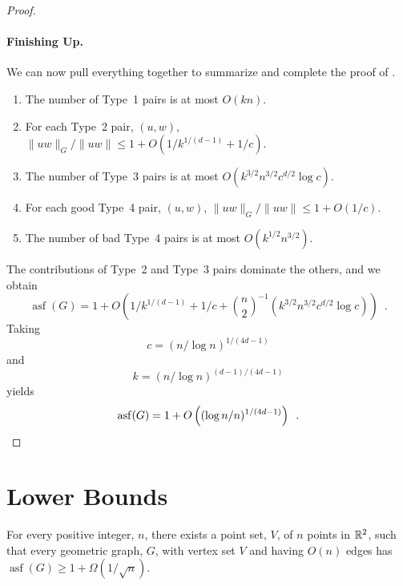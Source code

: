 \documentclass{patmorin}
\DeclareMathOperator{\asf}{asf}
\begin{document}
\begin{proof}
  \paragraph{Finishing Up.}
  We can now pull everything together to summarize and complete the proof
  of .
  \begin{enumerate}
    \item The number of Type~1 pairs is at most $O(kn)$.
    \item For each Type~2 pair, $(u,w)$, 
      $\|uw\|_G/\|uw\|\le 1+ O(1/k^{1/(d-1)}+1/c)$.
    \item The number of Type~3 pairs is at most
      $O(k^{3/2}n^{3/2}c^{d/2}\log c)$.
    \item For each good Type~4 pair, $(u,w)$, 
      $\|uw\|_G/\|uw\|\le 1+ O(1/c)$.
    \item The number of bad Type~4 pairs is at most 
       $O(k^{1/2}n^{3/2})$.
  \end{enumerate}
  The contributions of Type~2 and Type~3 pairs dominate the others, and
  we obtain
  \[
     \asf(G) = 1 + O\left(1/k^{1/(d-1)} + 1/c 
       + \binom{n}{2}^{-1}\left(k^{3/2}n^{3/2}c^{d/2}\log c\right)\right) \enspace .
  \]
  Taking 
  \[ 
       c = (n/\log n)^{1/(4d-1)}
  \]
  and
  \[
       k = (n/\log n)^{(d-1)/(4d-1)} 
  \]
  yields
  \[
     \asf(G) = 1+ O\left((\log n/n)^{1/(4d-1)}\right) \enspace . \qedhere
  \]
\end{proof}


\section{Lower Bounds}

\begin{thm}
  For every positive integer, $n$, there exists a point set, $V$, of $n$
  points in $\mathbb{R}^2$, such that every geometric graph, $G$, with vertex
  set $V$ and having $O(n)$ edges has $\asf(G)\ge 1 + \Omega(1/\sqrt{n})$.
\end{thm}
\end{document}
